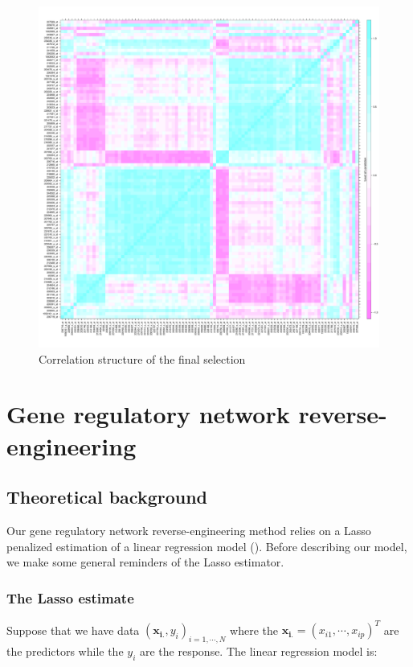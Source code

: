 \documentclass[a4paper]{article}
\begin{document}
\begin{figure}
\centering
\includegraphics[width=17cm]{z.pdf}
\caption{Correlation structure of the final selection}
\label{finalselec}
\end{figure}
\restoregeometry


\section{Gene regulatory network reverse-engineering}
\subsection{Theoretical background}

Our gene regulatory network reverse-engineering method relies on a Lasso penalized estimation of a linear regression model (\cite{tib}). Before describing our model, we make some general reminders of the Lasso estimator.

\subsubsection{The Lasso estimate}

Suppose that we have data $(\boldsymbol{x_{i.}},y_i)_{i=1,\dotsb,N}$ where the $\boldsymbol{x_{i.}}=(x_{i1},\dotsb,x_{ip})^T$ are the predictors while the $y_i$ are the response. 
The linear regression model is:
\end{document}
